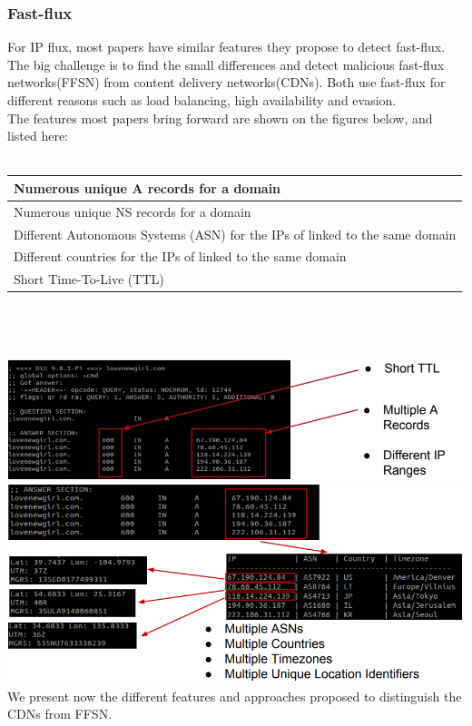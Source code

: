 \subsubsection{Fast-flux}
For IP flux, most papers have similar features they propose to detect fast-flux. The big challenge is to find the small differences and detect malicious fast-flux networks(FFSN) from content delivery networks(CDNs). Both use fast-flux for different reasons such as load balancing, high availability and evasion.\\
The features most papers \cite{honeynet}\cite{ff2}\cite{ff3}bring forward are shown on the figures below\cite{ff_botconf}, and listed here:\\\\
\begin{tabular}{|l|}
\hline
Numerous unique A records for a domain\\
\hline
Numerous unique NS records for a  domain\\
\hline
Different Autonomous Systems (ASN) for the IPs of linked to the same domain\\
\hline
Different countries for the IPs of linked to the same domain\\
\hline
Short Time-To-Live (TTL)\\
\hline
\end{tabular}
\\\\\\
\includegraphics[scale=.7]{img/ff_features.jpg}\\
\includegraphics[scale=.6]{img/ff_features_2.png}
\\We present now the different features and approaches proposed to distinguish the CDNs from FFSN.\\

